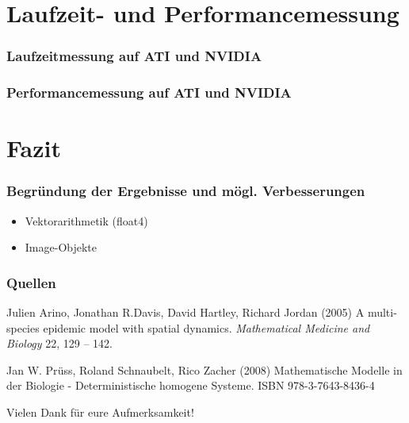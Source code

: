 \documentclass{beamer}
\begin{document}
\section{Laufzeit- und Performancemessung}
\begin{frame}
\frametitle{Laufzeitmessung auf ATI und NVIDIA}
\end{frame}

\begin{frame}
\frametitle{Performancemessung auf ATI und NVIDIA}
\end{frame}


\section{Fazit}
\begin{frame}
\frametitle{Begr\"undung der Ergebnisse und m\"ogl. Verbesserungen}

\begin{itemize}
\item Vektorarithmetik (float4)
\item Image-Objekte
\end{itemize}

 
\end{frame}














\begin{frame}
\frametitle{Quellen}

\footnotesize{
\begin{thebibliography}{99}
  Julien Arino, Jonathan R.Davis, David Hartley, Richard Jordan (2005)
 \newblock A multi-species epidemic model with spatial dynamics.
 \newblock \emph{Mathematical Medicine and Biology} 22, 129 -- 142.
\end{thebibliography}
}


\footnotesize{
\begin{thebibliography}{99}
  Jan W. Pr{\"u}ss,
 Roland Schnaubelt, Rico Zacher (2008)
 \newblock Mathematische Modelle
 in der Biologie - Deterministische homogene Systeme.
 \newblock ISBN 978-3-7643-8436-4
\end{thebibliography}
}


\end{frame}
 
 
 
\begin{frame}
\centerline{Vielen Dank f{\"u}r eure Aufmerksamkeit!}
\end{frame}
\end{document}
